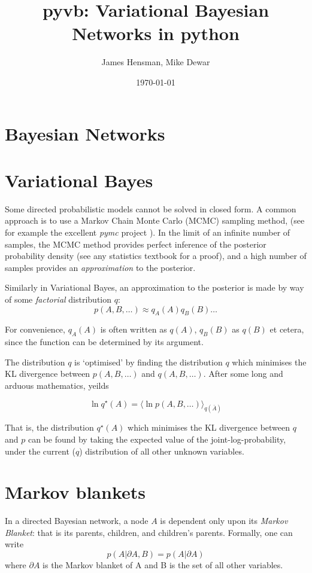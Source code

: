 \documentclass{article}
\title{pyvb: Variational Bayesian Networks in python}
\author{James Hensman, Mike Dewar}
\date{\today}
\newcommand{\qs}{q^\star}
\newcommand{\<}{\langle}
\renewcommand{\>}{\rangle}
\begin{document}
\maketitle

\section{Bayesian Networks}

\section{Variational Bayes}
Some directed probabilistic models cannot be solved in closed form. A common approach is to use a Markov Chain Monte Carlo (MCMC) sampling method, (see for example the excellent {\em pymc} project \cite{pymc}).  In the limit of an infinite number of samples, the MCMC method provides perfect inference of the posterior probability density (see any statistics textbook for a proof), and a high number of samples provides an {\em approximation} to the posterior.  

Similarly in Variational Bayes, an approximation to the posterior is made by way of some {\em factorial} distribution $q$:
\begin{equation}
p(A,B,\ldots) \approx q_A(A) q_B(B) \ldots
\end{equation}

For convenience, $q_A(A)$ is often written as $q(A)$, $q_B(B)$ as $q(B)$ et cetera, since the function can be determined by its argument. 

The distribution $q$ is `optimised' by finding the distribution $q$ which minimises the KL divergence between $p(A,B,\ldots)$ and $q(A,B,\ldots)$.  After some long and arduous mathematics, \citet{Bishop2006prm} yeilds

\begin{equation}
\ln \qs(A) = \< \ln p(A,B,\ldots)\>_{q(\bar A)}
\label{eq:VB_update}
\end{equation}

That is, the distribution $\qs(A)$ which minimises the KL divergence between $q$ and $p$ can be found by taking the expected value of the joint-log-probability, under the current ($q$) distribution of all other unknown variables. 

\section{Markov blankets}
In a directed Bayesian network, a node $A$ is dependent only upon its {\em Markov Blanket}: that is its parents, children, and children's parents. Formally, one can write
\begin{equation}
p(A|\partial A,B) = p(A | \partial A)
\end{equation}
where $\partial A$ is the Markov blanket of A and B is the set of all other variables.   
\end{document}
